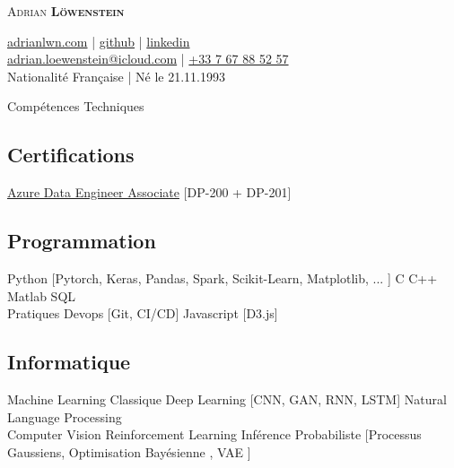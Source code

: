 \documentclass{article}
\newcommand{\longdescript}[1]{\color{subheadings}\normalfont\small {#1\\} }
\newcommand{\sectionsep}[0]{\vspace{-6pt}}
\newcommand{\namesection}[4]{
	\begin{center}
		\sffamily
		\headingfont\fontsize{35pt}{14pt}\selectfont\scshape #1 
			\headingfont\selectfont\scshape\bfseries #2
	\end{center}
	\vspace{-14pt}
		\begin{center} \color{subheadings}\normalfont\fontsize{11pt}{14pt}\selectfont #3
		\end{center}
	
	\vspace{-5pt}
	}
\newcommand{\mybullet}[1]{ \hspace{2pt}\textbullet{#1}\hspace{2pt} }
\begin{document}

\namesection{Adrian}{Löwenstein}{  \href{https://www.adrianlwn.com}{\faGlobe{} adrianlwn.com} | \href{https://github.com/adrianlwn}{\faGithubSquare{}  github}  | \href{https://www.linkedin.com/in/adrianloewenstein}{\faLinkedinSquare{}  linkedin} \\ \href{mailto:adrian.loewenstein@icloud.com}{\faEnvelope{} adrian.loewenstein@icloud.com} |  \href{tel:+33767885257}{\faPhoneSquare{} +33 7 67 88 52 57}  \\ Nationalité Française | Né le 21.11.1993 
 }





\section{Compétences Techniques}

\subsection{Certifications} 
\longdescript{\href{https://www.youracclaim.com/badges/b73a0c9c-6fdd-4d60-8df4-4297c0ebfe3f}{Azure Data Engineer Associate} [DP-200 + DP-201]
}
\sectionsep

\subsection{Programmation}
\longdescript{Python [Pytorch, Keras, Pandas, Spark, Scikit-Learn, Matplotlib, ... ] \mybullet{} C \mybullet{} C++ \mybullet{} Matlab \mybullet{} SQL \\ \hspace*{3pt} Pratiques Devops [Git, CI/CD] \mybullet{} Javascript [D3.js]}
\sectionsep

\subsection{Informatique} 
\longdescript{ Machine Learning Classique \mybullet{} Deep Learning [CNN, GAN, RNN, LSTM] \mybullet{} Natural Language Processing  \\ \hspace*{3pt} Computer Vision \mybullet{} Reinforcement Learning  \mybullet{} Inférence Probabiliste [Processus Gaussiens, Optimisation Bayésienne , VAE ]   } 
\sectionsep
\end{document}
